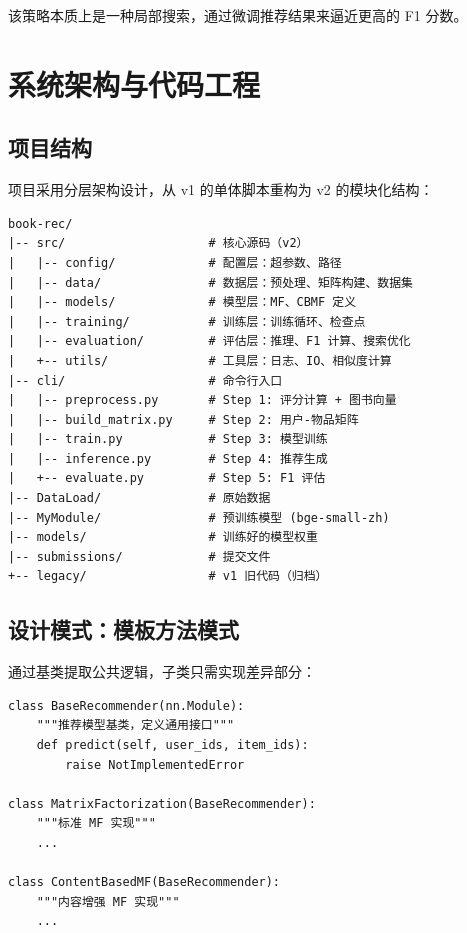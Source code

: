 \documentclass[12pt,a4paper]{article}
\begin{document}
该策略本质上是一种局部搜索，通过微调推荐结果来逼近更高的 F1 分数。

\section{系统架构与代码工程}

\subsection{项目结构}

项目采用分层架构设计，从 v1 的单体脚本重构为 v2 的模块化结构：

\begin{lstlisting}[caption={项目目录结构},language={},basicstyle=\ttfamily\small]
book-rec/
|-- src/                    # 核心源码（v2）
|   |-- config/             # 配置层：超参数、路径
|   |-- data/               # 数据层：预处理、矩阵构建、数据集
|   |-- models/             # 模型层：MF、CBMF 定义
|   |-- training/           # 训练层：训练循环、检查点
|   |-- evaluation/         # 评估层：推理、F1 计算、搜索优化
|   +-- utils/              # 工具层：日志、IO、相似度计算
|-- cli/                    # 命令行入口
|   |-- preprocess.py       # Step 1: 评分计算 + 图书向量
|   |-- build_matrix.py     # Step 2: 用户-物品矩阵
|   |-- train.py            # Step 3: 模型训练
|   |-- inference.py        # Step 4: 推荐生成
|   +-- evaluate.py         # Step 5: F1 评估
|-- DataLoad/               # 原始数据
|-- MyModule/               # 预训练模型 (bge-small-zh)
|-- models/                 # 训练好的模型权重
|-- submissions/            # 提交文件
+-- legacy/                 # v1 旧代码（归档）
\end{lstlisting}

\subsection{设计模式：模板方法模式}

通过基类提取公共逻辑，子类只需实现差异部分：

\begin{lstlisting}[caption={基类设计示例}]
class BaseRecommender(nn.Module):
    """推荐模型基类，定义通用接口"""
    def predict(self, user_ids, item_ids):
        raise NotImplementedError

class MatrixFactorization(BaseRecommender):
    """标准 MF 实现"""
    ...

class ContentBasedMF(BaseRecommender):
    """内容增强 MF 实现"""
    ...
\end{lstlisting}
\end{document}
